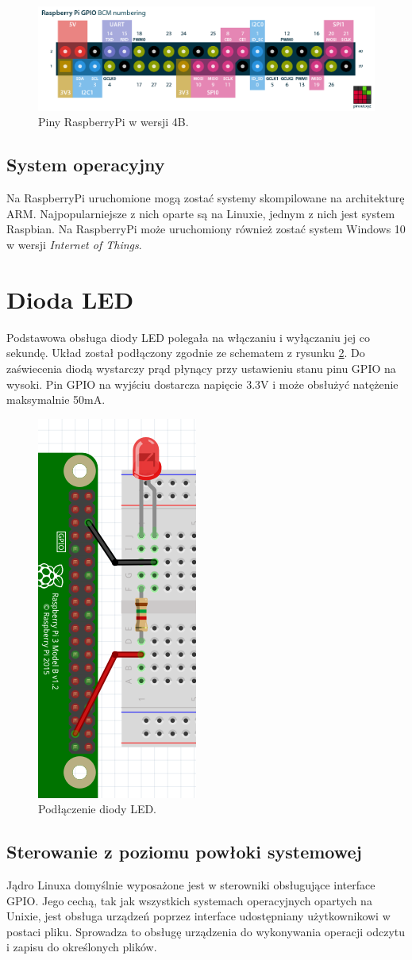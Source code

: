 \documentclass[12pt]{article}
\begin{document}
\begin{figure}[h]
  \centering
  \includegraphics[width=\linewidth]{raspberry-pi-pinout}
  \caption{Piny RaspberryPi w wersji 4B\cite{pinout}.}
  \label{raspi:2}
\end{figure}

\subsection{System operacyjny}
Na RaspberryPi uruchomione mogą zostać systemy skompilowane na architekturę ARM. Najpopularniejsze z nich oparte są na Linuxie, jednym z nich jest system Raspbian\cite{raspbian}. Na RaspberryPi może uruchomiony również zostać system Windows 10 w wersji \textit{Internet of Things}\cite{w10iot}.
\newpage
\section{Dioda LED}
Podstawowa obsługa diody LED polegała na włączaniu i wyłączaniu jej co sekundę. Układ został podłączony zgodnie ze schematem z rysunku \ref{sch:1}. Do zaświecenia diodą wystarczy prąd płynący przy ustawieniu stanu pinu GPIO na wysoki. Pin GPIO na wyjściu dostarcza napięcie 3.3V i może obsłużyć natężenie maksymalnie 50mA\cite{raspi:power}.

\begin{figure}[h]
  \centering
  \includegraphics[height=0.4\linewidth]{sch1}
  \caption{Podłączenie diody LED.}
  \label{sch:1}
\end{figure}

\subsection{Sterowanie z poziomu powłoki systemowej}
Jądro Linuxa domyślnie wyposażone jest w sterowniki obsługujące interface GPIO. Jego cechą, tak jak wszystkich systemach operacyjnych opartych na Unixie, jest obsługa urządzeń poprzez interface udostępniany użytkownikowi w postaci pliku. Sprowadza to obsługę urządzenia do wykonywania operacji odczytu i zapisu do określonych plików.
\end{document}
